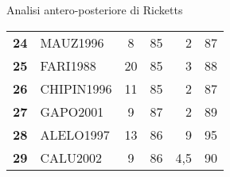 \begin{landscape}
\begin{table}
\begin{centeredcaption}{Analisi antero-posteriore di Ricketts}
\begin{tabular}{>{\bfseries}clc*{3}{D{,}{,}{-1}}}
24 & MAUZ1996 & 8 & 85 & 2 & 87 \\
25 & FARI1988 & 20 & 85 & 3 & 88 \\
26 & CHIPIN1996 & 11 & 85 & 2 & 87 \\
27 & GAPO2001 & 9 & 87 & 2 & 89 \\
28 & ALELO1997 & 13 & 86 & 9 & 95 \\
29 & CALU2002 & 9 & 86 & 4,5 & 90 \\
\bottomrule
\end{tabular}
\end{centeredcaption}
\end{table}

\end{landscape}